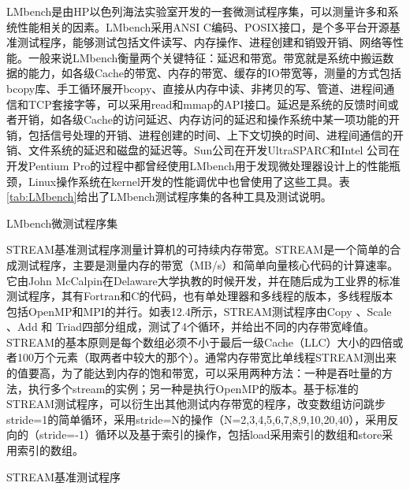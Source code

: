 \documentclass[]{ctexbook}
\begin{document}
LMbench是由HP以色列海法实验室开发的一套微测试程序集，可以测量许多和系统性能相关的因素。LMbench采用ANSI C编码、POSIX接口，是个多平台开源基准测试程序，能够测试包括文件读写、内存操作、进程创建和销毁开销、网络等性能。一般来说LMbench衡量两个关键特征：延迟和带宽。带宽就是系统中搬运数据的能力，如各级Cache的带宽、内存的带宽、缓存的IO带宽等，测量的方式包括bcopy库、手工循环展开bcopy、直接从内存中读、非拷贝的写、管道、进程间通信和TCP套接字等，可以采用read和mmap的API接口。延迟是系统的反馈时间或者开销，如各级Cache的访问延迟、内存访问的延迟和操作系统中某一项功能的开销，包括信号处理的开销、进程创建的时间、上下文切换的时间、进程间通信的开销、文件系统的延迟和磁盘的延迟等。Sun公司在开发UltraSPARC和Intel 公司在开发Pentium Pro的过程中都曾经使用LMbench用于发现微处理器设计上的性能瓶颈，Linux操作系统在kernel开发的性能调优中也曾使用了这些工具。表\ref{tab:LMbench}给出了LMbench测试程序集的各种工具及测试说明。

\label{tab:LMbench}LMbench微测试程序集

STREAM基准测试程序测量计算机的可持续内存带宽。STREAM是一个简单的合成测试程序，主要是测量内存的带宽（MB/s）和简单向量核心代码的计算速率。它由John McCalpin在Delaware大学执教的时候开发，并在随后成为工业界的标准测试程序，其有Fortran和C的代码，也有单处理器和多线程的版本，多线程版本包括OpenMP和MPI的并行。如表12.4所示，STREAM测试程序由Copy 、Scale 、Add 和 Triad四部分组成，测试了4个循环，并给出不同的内存带宽峰值。STREAM的基本原则是每个数组必须不小于最后一级Cache（LLC）大小的四倍或者100万个元素（取两者中较大的那个）。通常内存带宽比单线程STREAM测出来的值要高，为了能达到内存的饱和带宽，可以采用两种方法：一种是吞吐量的方法，执行多个stream的实例；另一种是执行OpenMP的版本。基于标准的STREAM测试程序，可以衍生出其他测试内存带宽的程序，改变数组访问跳步stride=1的简单循环，采用stride=N的操作（N=2,3,4,5,6,7,8,9,10,20,40），采用反向的（stride=-1）循环以及基于索引的操作，包括load采用索引的数组和store采用索引的数组。

\label{tab:STREAM}STREAM基准测试程序
\end{document}
